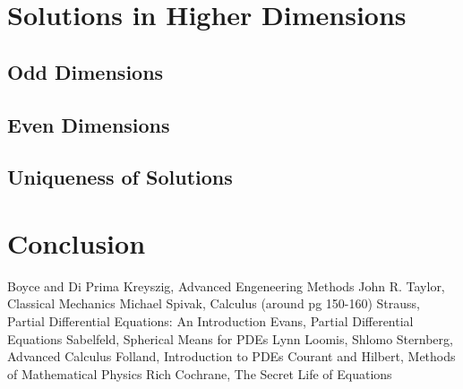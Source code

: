 \documentclass[a4paper, 12pt]{article}
\numberwithin{equation}{section}
\begin{document}
\section{Solutions in Higher Dimensions}

\subsection{Odd Dimensions}
\subsection{Even Dimensions}
\subsection{Uniqueness of Solutions}

\section{Conclusion}

\begin{thebibliography}{alpha}
 Boyce and Di Prima 
 Kreyszig, Advanced Engeneering Methods
 John R. Taylor, Classical Mechanics
 Michael Spivak, Calculus (around pg 150-160)
 Strauss, Partial Differential Equations: An Introduction
 Evans, Partial Differential Equations
 Sabelfeld, Spherical Means for PDEs
 Lynn Loomis, Shlomo Sternberg, Advanced Calculus
 Folland, Introduction to PDEs
 Courant and Hilbert, Methods of Mathematical Physics
 Rich Cochrane, The Secret Life of Equations
\end{thebibliography} 
\end{document}
